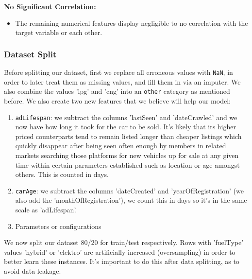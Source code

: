 \documentclass[conference]{IEEEtran}
\begin{document}
\textbf{No Significant Correlation:}
\begin{itemize}
    \item The remaining numerical features display negligible to no correlation
            with the target variable or each other.
\end{itemize}

\subsubsection{Dataset Split}
Before splitting our dataset, first we replace all erroneous values with
\texttt{NaN}, in order to later treat them as missing values, and fill them in
via an imputer. We also combine the values 'lpg' and 'cng' into an
\texttt{other} category as mentioned before. We also create two new features
that we believe will help our model:
\begin{enumerate}
        \item \texttt{adLifespan}: we subtract the columns 'lastSeen' and
                'dateCrawled' and we now have how long it took for the car to
                be sold. It's likely that its higher priced counterparts tend
                to remain listed longer than cheaper listings which quickly
                disappear after being seen often enough by members in related
                markets searching those platforms for new vehicles up for sale
                at any given time within certain parameters established such as
                location or age amongst others. This is counted in days.
        \item \texttt{carAge}: we subtract the columns 'dateCreated' and
                'yearOfRegistration' (we also add the 'monthOfRegistration'),
                we count this in days so it's in the same scale as
                'adLifespan'.
    \item Parameters or configurations
\end{enumerate}

We now split our dataset 80/20 for train/test respectively. Rows with
'fuelType' values 'hybrid' or 'elektro' are artificially increased
(oversampling) in order to better learn these instances. It's important to do 
this after data splitting, as to avoid data leakage.
\end{document}
